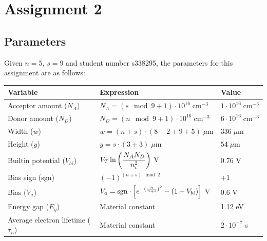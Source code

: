 \documentclass{book}
\begin{document}
    \newpage
    \chapter*{Assignment 2}
            
        \section{Parameters}
            Given $n = 5$, $s = 9$ and student number s338295, the parameters for this assignment are as follows:

            \begin{center}
                \renewcommand{\arraystretch}{1.8}
                \begin{tabular}{ | m{4.5cm} | m{7.5cm} | m{2.5cm} | }
                    \hline 
                        \textbf{Variable} & \textbf{Expression} & \textbf{Value} \\
                    \hline
                        Acceptor amount ($N_{A}$) & $N_{A} = (s \mod 9 + 1) \cdot 10^{16} \; \text{cm}^{-3}$ & $1 \cdot 10^{16} \; \text{cm}^{-3}$ \\
                    \hline
                        Donor amount ($N_{D}$) & $N_{D} = (n \mod 9 + 1) \cdot 10^{16} \; \text{cm}^{-3}$ & $6 \cdot 10^{16} \; \text{cm}^{-3}$ \\
                    \hline 
                        Width ($w$) & $w = (n + s) \cdot (8 + 2 + 9 + 5) \; \mu\text{m}$ & $336 \; \mu\text{m}$ \\
                    \hline
                        Height ($y$) & $y = s \cdot (3 + 3) \; \mu\text{m}$ & $54 \; \mu\text{m}$ \\ 
                    \hline
                        Builtin potential ($V_{bi}$) & $\displaystyle V_{T} \ln\qty(\frac{N_{A}N_{D}}{n_{i}^{2}})$ V &  0.76 V \\[6pt]
                    \hline
                        Bias sign (sgn) & $\displaystyle (-1)^{(n+s) \mod 2}$ & +1 \\[4pt]
                    \hline
                        Bias ($V_{a}$) & $\displaystyle V_{a} = \text{sgn} \cdot \qty[ e^{-(\frac{n}{n+s})^{2}} - (1 - V_{bi})]$ V & 0.6 V \\[4pt]
                    \hline
                        Energy gap ($E_{g}$) & Material constant & 1.12 eV \\
                    \hline
                        Average electron lifetime ($\tau_{n}$) & Material constant & $2 \cdot 10^{-7}$ s \\

\end{tabular}
\end{center}
\end{document}
